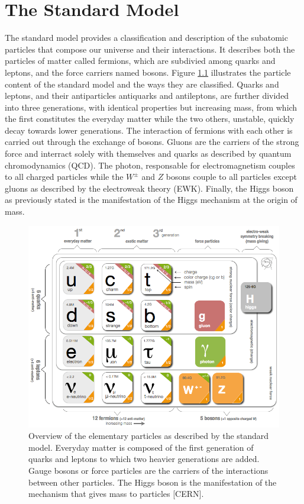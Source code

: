 \chapter{The Standard Model}
\label{chap:I-1-standard-model}

  The standard model provides a classification and description of the subatomic particles that compose our universe and their interactions. It describes both the particles of matter called fermions, which are subdivied among quarks and leptons, and the force carriers named bosons. Figure \ref{fig:I-1-sm-particles} illustrates the particle content of the standard model and the ways they are classified. Quarks and leptons, and their antiparticles antiquarks and antileptons, are further divided into three generations, with identical properties but increasing mass, from which the first constitutes the everyday matter while the two others, unstable, quickly decay towards lower generations. The interaction of fermions with each other is carried out through the exchange of bosons. Gluons are the carriers of the strong force and interract solely with themselves and quarks as described by quantum chromodynamics (QCD). The photon, responsable for electromagnetism couples to all charged particles while the $ W^\pm $ and $ Z $ bosons couple to all particles except gluons as described by the electroweak theory (EWK). Finally, the Higgs boson as previously stated is the manifestation of the Higgs mechanism at the origin of mass. \\

	\begin{figure}[h!]
		\centering
		\includegraphics[width=\textwidth]{img/I-1-standard-model/sm-particles.png}
		\caption{Overview of the elementary particles as described by the standard model. Everyday matter is composed of the first generation of quarks and leptons to which two heavier generations are added. Gauge bosons or force particles are the carriers of the interactions between other particles. The Higgs boson is the manifestation of the mechanism that gives mass to particles [CERN].}
		\label{fig:I-1-sm-particles}
	\end{figure}

